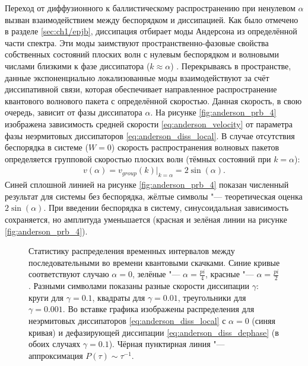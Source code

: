 Переход от диффузионного к баллистическому распространению при ненулевом \(\alpha\) вызван взаимодействием между беспорядком и диссипацией. 
Как было отмечено в разделе \cref{sec:ch1/epjb}, диссипация отбирает моды Андерсона из определённой части спектра. 
Эти моды заимствуют пространственно-фазовые свойства собственных состояний плоских волн с нулевым беспорядком и волновыми числами близкими к фазе диссипатора (\(k\approx \alpha\)) \cite{Vershinina2017, Ishii1973}. 
Перекрываясь в пространстве, данные экспоненциально локализованные моды взаимодействуют за счёт диссипативной связи, которая обеспечивает направленное распространение квантового волнового пакета с определённой скоростью. 
Данная скорость, в свою очередь, зависит от фазы диссипатора \(\alpha\). 
На рисунке \cref{fig:anderson_prb_4} изображена зависимость средней скорости \cref{eq:anderson_velocity} от параметра фазы неэрмитовых диссипаторов \cref{eq:anderson_diss_local}. В случае отсутствия беспорядка в системе (\(W=0\)) скорость распространения волновых пакетов определяется групповой скоростью плоских волн (тёмных состояний при \(k=\alpha\)):
\begin{equation}
\label{eq:anderson_velocity_sin}
\begin{gathered}
v(\alpha) = v_{group}(k)|_{k=\alpha} = 2 \sin(\alpha) .
\end{gathered}
\end{equation}
Синей сплошной линией на рисунке \cref{fig:anderson_prb_4} показан численный результат для системы без беспорядка, жёлтые символы "--- теоретическая оценка \(2 \sin(\alpha)\). 
При введении беспорядка в систему, синусоидальная зависимость сохраняется, но амплитуда уменьшается (красная и зелёная линии на рисунке \cref{fig:anderson_prb_4}).

\begin{figure}[h]
	\caption{
		Статистику распределения временных интервалов между последовательными во времени квантовыми скачками. Синие кривые соответствуют случаю \(\alpha=0\), зелёные "--- \(\alpha = \frac{pi}{4}\), красные "--- \(\alpha = \frac{pi}{2}\). Разными символами показаны разные скорости диссипации \(\gamma\):  круги для \(\gamma=0.1\), квадраты для \(\gamma=0.01\), треугольники для \(\gamma=0.001\). Во вставке графика изображены распределения для неэрмитовых диссипаторов \cref{eq:anderson_diss_local} с \(\alpha=0\) (синяя кривая) и дефазирующей диссипации \cref{eq:anderson_diss_dephase} (в обоих случаях \(\gamma=0.1\)). Чёрная пунктирная линия "--- аппроксимация \(P(\tau) \sim \tau^{-1}\).
	}
	\label{fig:anderson_prb_5}
\end{figure}

